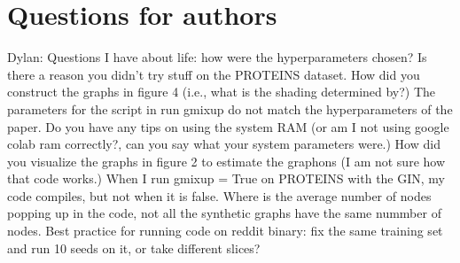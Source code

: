 \documentclass[12pt]{amsart}
\begin{document}
\section{Questions for authors}

Dylan: Questions I have about life: how were the hyperparameters chosen? Is there a reason you didn't try stuff on the PROTEINS dataset. How did you construct the graphs in figure 4 (i.e., what is the shading determined by?) The parameters for the script in run gmixup do not match the hyperparameters of the paper. Do you have any tips on using the system RAM (or am I not using google colab ram correctly?, can you say what your system parameters were.) How did you visualize the graphs in figure 2 to estimate the graphons (I am not sure how that code works.) When I run gmixup = True on PROTEINS with the GIN, my code compiles, but not when it is false. Where is the average number of nodes popping up in the code, not all the synthetic graphs have the same nummber of nodes. Best practice for running code on reddit binary: fix the same training set and run 10 seeds on it, or take different slices? 





\end{document}
